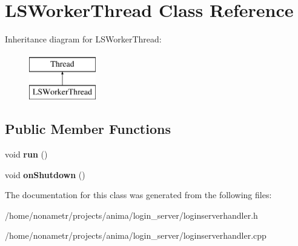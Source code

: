 \hypertarget{classLSWorkerThread}{
\section{LSWorkerThread Class Reference}
\label{classLSWorkerThread}
}
Inheritance diagram for LSWorkerThread:\begin{figure}[H]
\begin{center}
\leavevmode
\includegraphics[height=2.000000cm]{classLSWorkerThread}
\end{center}
\end{figure}
\subsection*{Public Member Functions}
\begin{DoxyCompactItemize}
\item 
\hypertarget{classLSWorkerThread_aa695e8f8c674c89102aebee7b593c5a9}{
void {\bfseries run} ()}
\label{classLSWorkerThread_aa695e8f8c674c89102aebee7b593c5a9}

\item 
\hypertarget{classLSWorkerThread_ab35c50ab2706844a8cc649320c3cdcfb}{
void {\bfseries onShutdown} ()}
\label{classLSWorkerThread_ab35c50ab2706844a8cc649320c3cdcfb}

\end{DoxyCompactItemize}


The documentation for this class was generated from the following files:\begin{DoxyCompactItemize}
\item 
/home/nonametr/projects/anima/login\_\-server/loginserverhandler.h\item 
/home/nonametr/projects/anima/login\_\-server/loginserverhandler.cpp\end{DoxyCompactItemize}
